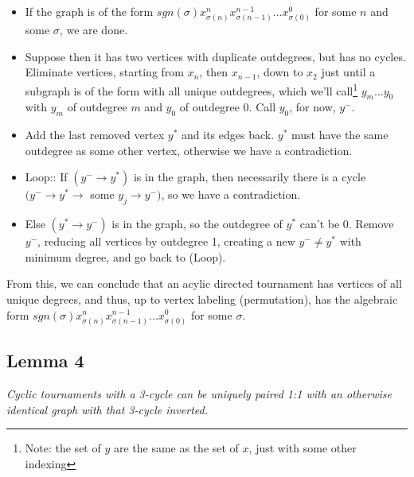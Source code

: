 \documentclass[11pt, oneside]{article} 	%
\begin{document}
\begin{itemize}
\item If the graph is of the form $sgn(\sigma) x_{\sigma(n)}^nx_{\sigma(n-1)}^{n-1}  ... x_{\sigma(0)}^{0}$ for some $n$ and some $\sigma$, we are done.
\item Suppose then it has two vertices with duplicate outdegrees, but has no cycles. Eliminate vertices, starting from $x_n$, then $x_{n-1}$, down to $x_2$ just until a subgraph is of the form with all unique outdegrees, which we'll call\footnote{Note: the set of $y$ are the same as the set of $x$, just with some other indexing} $y_{m} ... y_0$ with $y_m$ of outdegree $m$ and $y_0$ of outdegree 0.  Call $y_0$, for now, $y^-$.
\item Add the last removed vertex $y^*$ and its edges back.  $y^*$ must have the same outdegree as some other vertex, otherwise we have a contradiction.
\item Loop:: If $(y^- \rightarrow y^*)$ is in the graph, then necessarily there is a cycle $(y^- \rightarrow y^* \rightarrow $ some $y_j \rightarrow y^-)$, so we have a contradiction.
\item Else $(y^* \rightarrow y^-)$ is in the graph, so the outdegree of $y^*$ can't be 0.  Remove $y^-$, reducing all vertices by outdegree 1, creating a new $y^- \neq y^*$ with minimum degree, and go back to (Loop).
\end{itemize}

From this, we can conclude that an acylic directed tournament has vertices of all unique degrees, and thus, up to vertex labeling (permutation), has the algebraic form $sgn(\sigma) x_{\sigma(n)}^nx_{\sigma(n-1)}^{n-1}  ... x_{\sigma(0)}^{0}$  for some $\sigma$.

\subsection{Lemma 4}

\emph{Cyclic tournaments with a 3-cycle can be uniquely paired 1:1 with an otherwise identical graph with that 3-cycle inverted.}
\end{document}
